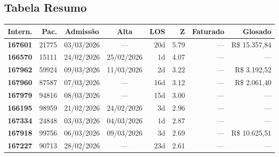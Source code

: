 \documentclass[a4paper,10pt]{article}
\begin{document}
\subsection{Tabela Resumo}
\begin{center}
\begin{longtable}{>{\scriptsize}r>{\scriptsize}r>{\scriptsize}c>{\scriptsize}c>{\scriptsize}r>{\scriptsize}r>{\scriptsize}r>{\scriptsize}r}
\toprule
\textbf{Intern.} & \textbf{Pac.} & \textbf{Admiss\~{a}o} & \textbf{Alta} & \textbf{LOS} & \textbf{Z} & \textbf{Faturado} & \textbf{Glosado} \\
\midrule
\endhead
\bottomrule
\endfoot

\textcolor{anomred}{\textbf{167601}} & 21775 & 03/03/2026 & — & 20d & \textcolor{anomred}{5.79} & --- & \textcolor{anomred}{R\$ 15.357,84} \\

\textcolor{anomorange}{\textbf{166570}} & 15111 & 24/02/2026 & 25/02/2026 & 1d & \textcolor{anomorange}{4.07} & --- & --- \\

\textcolor{anomorange}{\textbf{167962}} & 59924 & 09/03/2026 & 11/03/2026 & 2d & \textcolor{anomorange}{3.22} & --- & \textcolor{anomred}{R\$ 3.192,52} \\

\textcolor{anomorange}{\textbf{167960}} & 87587 & 07/03/2026 & — & 16d & \textcolor{anomorange}{3.12} & --- & \textcolor{anomred}{R\$ 2.061,40} \\

\textcolor{anomorange}{\textbf{167979}} & 94816 & 08/03/2026 & — & 15d & \textcolor{anomorange}{3.00} & --- & --- \\

\textcolor{anomyellow}{\textbf{166195}} & 98959 & 21/02/2026 & 24/02/2026 & 3d & \textcolor{anomyellow}{2.96} & --- & --- \\

\textcolor{anomyellow}{\textbf{167334}} & 24848 & 03/03/2026 & 04/03/2026 & 1d & \textcolor{anomyellow}{2.87} & --- & --- \\

\textcolor{anomyellow}{\textbf{167918}} & 99756 & 06/03/2026 & 09/03/2026 & 3d & \textcolor{anomyellow}{2.69} & --- & \textcolor{anomred}{R\$ 10.625,51} \\

\textcolor{anomyellow}{\textbf{167227}} & 90713 & 28/02/2026 & — & 23d & \textcolor{anomyellow}{2.61} & --- & --- \\


\end{longtable}
\end{center}
\end{document}
